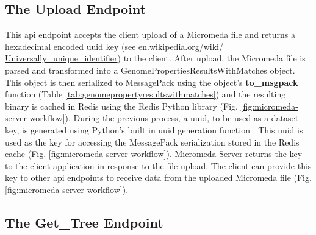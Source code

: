 \subsection{The Upload Endpoint} \label{endpoint-upload}

This \gls{api} endpoint accepts the client upload of a Micromeda file and 
returns a hexadecimal encoded \gls{uuid} key \cite{leach2005universally} (see 
\href{http://en.wikipedia.org/wiki/Universally_unique_identifier}{en.wikipedia.org/wiki/ 
Universally\_unique\_identifier}) to the client. After upload, the Micromeda 
file is parsed and transformed into a GenomePropertiesResultsWithMatches object. 
This object is then serialized to MessagePack using the object's 
\textbf{to\_msgpack} function (Table \ref{tab:genomepropertyresultswithmatches}) 
and the resulting binary is cached in Redis using the Redis Python library 
\cite{mccurdy_2019} (Fig. \ref{fig:micromeda-server-workflow}). During the 
previous process, a \gls{uuid}, to be used as a dataset key, is generated using 
Python's built in \gls{uuid} generation function \cite{PythonUUID}. This 
\gls{uuid} is used as the key for accessing the MessagePack serialization stored 
in the Redis cache (Fig. \ref{fig:micromeda-server-workflow}). Micromeda-Server 
returns the key to the client application in response to the file upload. The 
client can provide this key to other \gls{api} endpoints to receive data from 
the uploaded Micromeda file (Fig. \ref{fig:micromeda-server-workflow}). 

\subsection{The Get\_Tree Endpoint} \label{get-tree}

